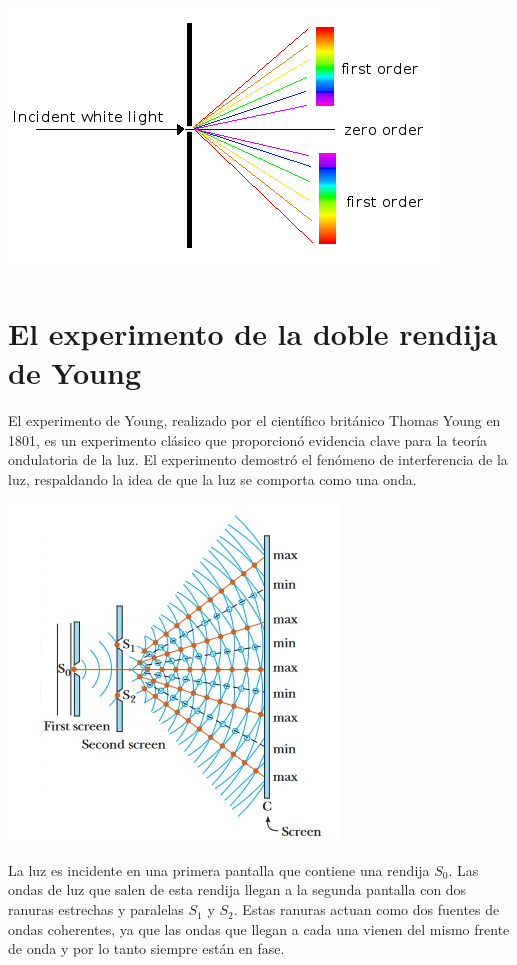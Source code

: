 \documentclass[a4paper,12pt]{article}
\newenvironment{Figure}
  {\par\medskip\noindent\minipage{\linewidth}}
  {\endminipage\par\medskip}
\begin{document}
    \begin{Figure}
        \centering
        \includegraphics[width=0.6\linewidth]{Diffraction.png}
        \label{fig: patronDifraccion}
    \end{Figure}

\section*{El experimento de la doble rendija de Young}

    El experimento de Young, realizado por el científico británico Thomas Young en 1801, es un experimento clásico que proporcionó evidencia clave para la teoría ondulatoria de la luz. El experimento demostró el fenómeno de interferencia de la luz, respaldando la idea de que la luz se comporta como una onda.

    \begin{Figure}
        \centering
        \includegraphics[width=0.5\linewidth]{Young.jpg}
        \label{fig: Young}
    \end{Figure}

    La luz es incidente en una primera pantalla que contiene una rendija $S_0$. Las ondas de luz que salen de esta rendija llegan a la segunda pantalla con dos ranuras estrechas y paralelas $S_1$ y $S_2$. Estas ranuras actuan como dos fuentes de ondas coherentes, ya que las ondas que llegan a cada una vienen del mismo frente de onda y por lo tanto siempre están en fase.
\end{document}
